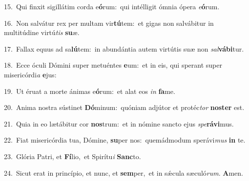 {\numbfont\textcolor{\numbcolor}{15.}}~Qui finxit sigillátim corda e\-\textbf{ó}\-rum:~\star qui intélligit ómnia ópera \textit{e}\-\textbf{ó}rum.\par
{\numbfont\textcolor{\numbcolor}{16.}}~Non salvátur rex per multam vir\-\textbf{tú}\-tem:~\star et gigas non salvábitur in multitúdine virtú\textit{tis} \textbf{su}\-æ.\par
{\numbfont\textcolor{\numbcolor}{17.}}~Fallax equus ad sa\-\textbf{lú}\-tem:~\star in abundántia autem virtútis suæ non \textit{sal}\-\textbf{vá}\textbf{bi}tur.\par
{\numbfont\textcolor{\numbcolor}{18.}}~Ecce óculi Dómini super metuéntes \textbf{e}\-um:~\star et in eis, qui sperant super misericórdi\textit{a} \textbf{e}\-jus:\par
{\numbfont\textcolor{\numbcolor}{19.}}~Ut éruat a morte ánimas e\-\textbf{ó}\-rum:~\star et alat eos \textit{in} \textbf{fa}\-me.\par
{\numbfont\textcolor{\numbcolor}{20.}}~Anima nostra sústinet \textbf{Dó}\-minum:~\star quóniam adjútor et protéc\textit{tor} \textbf{nos}\-\textbf{ter} est.\par
{\numbfont\textcolor{\numbcolor}{21.}}~Quia in eo lætábitur cor \textbf{nos}\-trum:~\star et in nómine sancto ejus \textit{spe}\-\textbf{rá}\textbf{vi}mus.\par
{\numbfont\textcolor{\numbcolor}{22.}}~Fiat misericórdia tua, Dómine, \textbf{su}\-per nos:~\star quemádmodum sperávi\textit{mus} \textbf{in} te.\par
{\numbfont\textcolor{\numbcolor}{23.}}~Glória Patri, et \textbf{Fí}\-lio,~\star et Spirítu\textit{i} \textbf{Sanc}\-to.\par
{\numbfont\textcolor{\numbcolor}{24.}}~Sicut erat in princípio, et nunc, et \textbf{sem}\-per,~\star et in sǽcula sæculó\-\textit{rum}\-. \textbf{A}\-men.\par
